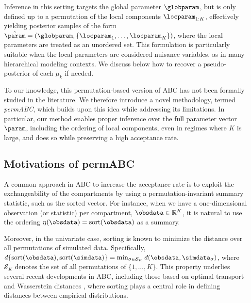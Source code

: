 Inference in this setting targets the global parameter \( \globparam \), but is only defined up to a permutation of the local components \( \locparam_{1:K} \), effectively yielding posterior samples of the form \( \Tilde{\param} = (\globparam, \{\locparam_1, \dots, \locparam_K\})\),
where the local parameters are treated as an unordered set. This formulation is particularly suitable when the local parameters are considered nuisance variables, as in many hierarchical modeling contexts. We discuss below how to recover a pseudo-posterior of each $\mu_k$ if needed.

To our knowledge, this permutation-based version of ABC has not been formally studied in the literature. We therefore introduce a novel methodology, termed \emph{permABC}, which builds upon this idea while addressing its limitations. In particular, our method enables proper inference over the full parameter vector \( \param \), including the ordering of local components, even in regimes where \( K \) is large, and does so while preserving a high acceptance rate.




\subsection{Motivations of permABC}

A common approach in ABC to increase the acceptance rate is to exploit the exchangeability of the compartments by using a permutation-invariant summary statistic, such as the sorted vector. For instance, when we have a one-dimensional observation (or statistic) per compartment, $\obsdata \in \mathbb{R}^K$, it is natural to use the ordering $\eta(\obsdata) = \text{sort}(\obsdata)$ as a summary. 

Moreover, in the univariate case, sorting is known to minimize the distance over all permutations of simulated data. Specifically, $d\{\text{sort}(\obsdata), \text{sort}(\simdata)\} = \min_{\sigma \in \mathcal{S}_K} d(\obsdata, \simdata_{\sigma})$, where $\mathcal{S}_K$ denotes the set of all permutations of $\{1,\dots,K\}$. This property underlies several recent developments in ABC, including those based on optimal transport and Wasserstein distances \citep{bernton2019approximate}, where sorting plays a central role in defining distances between empirical distributions.

